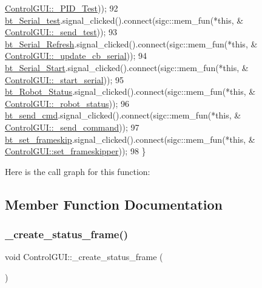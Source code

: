 \begin{DoxyCode}
      \hyperlink{class_control_g_u_i_a90dbd3d101fa49c6926e3cef452fb0a2}{ControlGUI::\_PID\_Test}));
92     \hyperlink{class_control_g_u_i_a877559405ad1764d83748016a0f09d94}{bt\_Serial\_test}.signal\_clicked().connect(sigc::mem\_fun(*\textcolor{keyword}{this}, &
      \hyperlink{class_control_g_u_i_a0838b5d3b0d6651b7a1a58928bc83327}{ControlGUI::\_send\_test}));
93     \hyperlink{class_control_g_u_i_a391e47311e2e097bf551726b1df5d794}{bt\_Serial\_Refresh}.signal\_clicked().connect(sigc::mem\_fun(*\textcolor{keyword}{this}, &
      \hyperlink{class_control_g_u_i_ac1c2a324c056d78dae8e2a0123855dc1}{ControlGUI::\_update\_cb\_serial}));
94     \hyperlink{class_control_g_u_i_ae4c22e835b13a173a02ef4514b28c7f1}{bt\_Serial\_Start}.signal\_clicked().connect(sigc::mem\_fun(*\textcolor{keyword}{this}, &
      \hyperlink{class_control_g_u_i_ab56193e598145a8ad679029abaf0fd46}{ControlGUI::\_start\_serial}));
95     \hyperlink{class_control_g_u_i_aa41e46c34d55d0d4c7b53ed2fa14deb8}{bt\_Robot\_Status}.signal\_clicked().connect(sigc::mem\_fun(*\textcolor{keyword}{this}, &
      \hyperlink{class_control_g_u_i_abe917aff974bd6ac9ce5193edc864814}{ControlGUI::\_robot\_status}));
96     \hyperlink{class_control_g_u_i_a8002683eca7855b1d49f16258ad0e889}{bt\_send\_cmd}.signal\_clicked().connect(sigc::mem\_fun(*\textcolor{keyword}{this}, &
      \hyperlink{class_control_g_u_i_a26002e2fa3dd7bcac791f54276670004}{ControlGUI::\_send\_command}));
97     \hyperlink{class_control_g_u_i_a7cfe9a6fc63a33ccd1f89fb98315340c}{bt\_set\_frameskip}.signal\_clicked().connect(sigc::mem\_fun(*\textcolor{keyword}{this}, &
      \hyperlink{class_control_g_u_i_ab3017ac43a33b7dd0a79db25e354fcf2}{ControlGUI::set\_frameskipper}));
98 \}
\end{DoxyCode}
Here is the call graph for this function\+:


\subsection{Member Function Documentation}
\mbox{\label{class_control_g_u_i_ae1e6b2a93d61568a7bf5cdc5870e1f6c}} 
\subsubsection{\texorpdfstring{\+\_\+create\+\_\+status\+\_\+frame()}{\_create\_status\_frame()}}
{\footnotesize\ttfamily void Control\+G\+U\+I\+::\+\_\+create\+\_\+status\+\_\+frame (\begin{DoxyParamCaption}{ }\end{DoxyParamCaption})}



